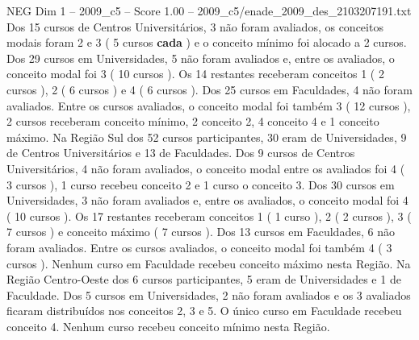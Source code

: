 \begin{textsample}{NEG Dim 1 – 2009\_c5 – Score 1.00 – 2009\_c5/enade\_2009\_des\_2103207191.txt}
Dos 15 cursos de Centros Universitários, 3 não foram avaliados, os conceitos modais foram 2 e 3 ( 5 cursos \textbf{cada} ) e o conceito mínimo foi alocado a 2 cursos.
Dos 29 cursos em Universidades, 5 não foram avaliados e, entre os avaliados, o conceito modal foi 3 ( 10 cursos ).
Os 14 restantes receberam conceitos 1 ( 2 cursos ), 2 ( 6 cursos ) e 4 ( 6 cursos ).
Dos 25 cursos em Faculdades, 4 não foram avaliados.
Entre os cursos avaliados, o conceito modal foi também 3 ( 12 cursos ), 2 cursos receberam conceito mínimo, 2 conceito 2, 4 conceito 4 e 1 conceito máximo.
Na Região Sul dos 52 cursos participantes, 30 eram de Universidades, 9 de Centros Universitários e 13 de Faculdades.
Dos 9 cursos de Centros Universitários, 4 não foram avaliados, o conceito modal entre os avaliados foi 4 ( 3 cursos ), 1 curso recebeu conceito 2 e 1 curso o conceito 3.
Dos 30 cursos em Universidades, 3 não foram avaliados e, entre os avaliados, o conceito modal foi 4 ( 10 cursos ).
Os 17 restantes receberam conceitos 1 ( 1 curso ), 2 ( 2 cursos ), 3 ( 7 cursos ) e conceito máximo ( 7 cursos ).
Dos 13 cursos em Faculdades, 6 não foram avaliados.
Entre os cursos avaliados, o conceito modal foi também 4 ( 3 cursos ).
Nenhum curso em Faculdade recebeu conceito máximo nesta Região.
Na Região Centro-Oeste dos 6 cursos participantes, 5 eram de Universidades e 1 de Faculdade.
Dos 5 cursos em Universidades, 2 não foram avaliados e os 3 avaliados ficaram distribuídos nos conceitos 2, 3 e 5.
O único curso em Faculdade recebeu conceito 4.
Nenhum curso recebeu conceito mínimo nesta Região.

\end{textsample}
